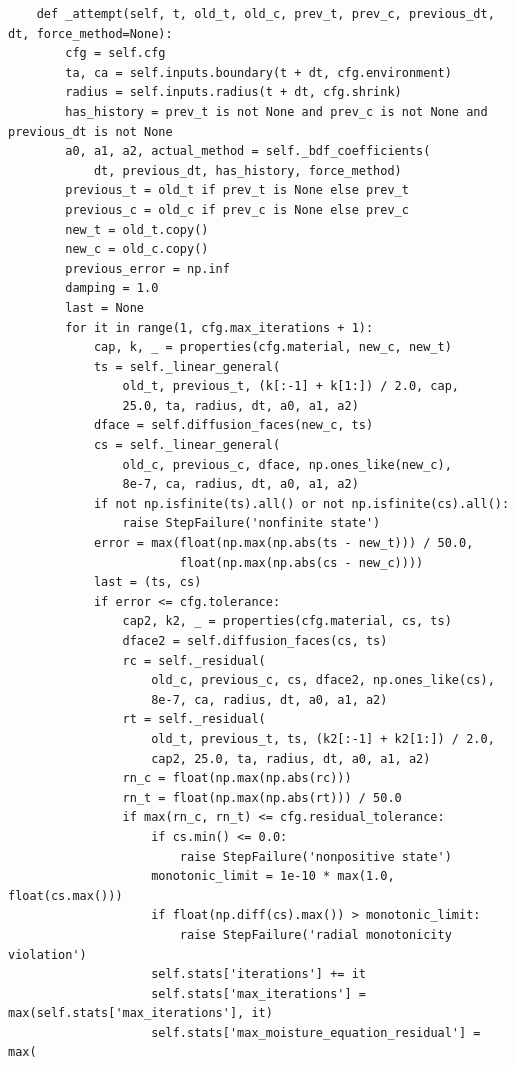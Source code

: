 \begin{verbatim}
    def _attempt(self, t, old_t, old_c, prev_t, prev_c, previous_dt, dt, force_method=None):
        cfg = self.cfg
        ta, ca = self.inputs.boundary(t + dt, cfg.environment)
        radius = self.inputs.radius(t + dt, cfg.shrink)
        has_history = prev_t is not None and prev_c is not None and previous_dt is not None
        a0, a1, a2, actual_method = self._bdf_coefficients(
            dt, previous_dt, has_history, force_method)
        previous_t = old_t if prev_t is None else prev_t
        previous_c = old_c if prev_c is None else prev_c
        new_t = old_t.copy()
        new_c = old_c.copy()
        previous_error = np.inf
        damping = 1.0
        last = None
        for it in range(1, cfg.max_iterations + 1):
            cap, k, _ = properties(cfg.material, new_c, new_t)
            ts = self._linear_general(
                old_t, previous_t, (k[:-1] + k[1:]) / 2.0, cap,
                25.0, ta, radius, dt, a0, a1, a2)
            dface = self.diffusion_faces(new_c, ts)
            cs = self._linear_general(
                old_c, previous_c, dface, np.ones_like(new_c),
                8e-7, ca, radius, dt, a0, a1, a2)
            if not np.isfinite(ts).all() or not np.isfinite(cs).all():
                raise StepFailure('nonfinite state')
            error = max(float(np.max(np.abs(ts - new_t))) / 50.0,
                        float(np.max(np.abs(cs - new_c))))
            last = (ts, cs)
            if error <= cfg.tolerance:
                cap2, k2, _ = properties(cfg.material, cs, ts)
                dface2 = self.diffusion_faces(cs, ts)
                rc = self._residual(
                    old_c, previous_c, cs, dface2, np.ones_like(cs),
                    8e-7, ca, radius, dt, a0, a1, a2)
                rt = self._residual(
                    old_t, previous_t, ts, (k2[:-1] + k2[1:]) / 2.0,
                    cap2, 25.0, ta, radius, dt, a0, a1, a2)
                rn_c = float(np.max(np.abs(rc)))
                rn_t = float(np.max(np.abs(rt))) / 50.0
                if max(rn_c, rn_t) <= cfg.residual_tolerance:
                    if cs.min() <= 0.0:
                        raise StepFailure('nonpositive state')
                    monotonic_limit = 1e-10 * max(1.0, float(cs.max()))
                    if float(np.diff(cs).max()) > monotonic_limit:
                        raise StepFailure('radial monotonicity violation')
                    self.stats['iterations'] += it
                    self.stats['max_iterations'] = max(self.stats['max_iterations'], it)
                    self.stats['max_moisture_equation_residual'] = max(

\end{verbatim}
